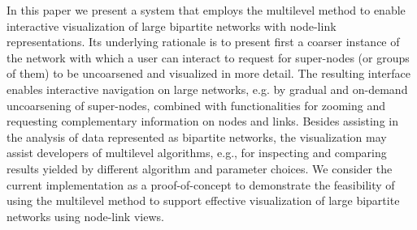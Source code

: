 \documentclass[runningheads]{llncs}
\begin{document}
In this paper we present a system that employs the multilevel method to enable interactive visualization of large bipartite networks with node-link representations. Its underlying rationale is to present first a coarser instance of the network with which a user can interact to request for super-nodes (or groups of them) to be uncoarsened and visualized in more detail.
The resulting interface enables interactive navigation on large networks, e.g. by gradual and on-demand uncoarsening of super-nodes, combined with functionalities for zooming and requesting complementary information on nodes and links. Besides assisting in the analysis of data represented as bipartite networks, the visualization may assist developers of multilevel algorithms, e.g., for inspecting and comparing results yielded by different algorithm and parameter choices. 
We consider the current implementation as a proof-of-concept to demonstrate the feasibility of using the multilevel method to support effective visualization of large bipartite networks using node-link views.

\end{document}
